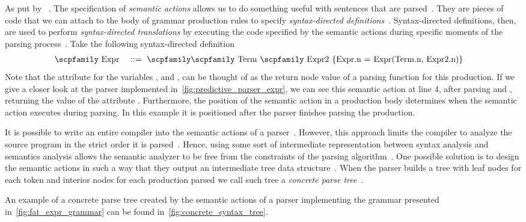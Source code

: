 \documentclass[
  oneside,
  english,
  coorientadorbanca,
  noabntexcite
]{ufsc-thesis-rn46-2019}
\def\bnfdef{::=}
\newcommand{\codett}[1]{\text{\scpfamily#1}}
\newcommand{\code}[1]{\text{\scpfamily\setlength\spaceskip{0.35em}#1}}
\newcommand{\bnfvar}[1]{\codett{#1}}
\newcommand{\bnfprod}[2]{\bnfvar{#1} & \ & \bnfdef{} & \ \code{#2}}
\begin{document}
As put by~\textcite{appel2003modern} .
The specification of \textit{semantic actions} allows us to do something useful with sentences that are parsed~\cite{appel2003modern}.
They are pieces of code that we can attach to the body of grammar production rules to specify \textit{syntax-directed definitions}~\cite{Aho:2006:CPT:1177220}.
Syntax-directed definitions, then, are used to perform \textit{syntax-directed translations} by executing the code specified by the semantic actions during specific moments of the parsing process~\cite{Aho:2006:CPT:1177220}.
Take the following syntax-directed definition
\begin{alignat}{2}
  \bnfprod{Expr}{\bnfvar{Term} \bnfvar{Expr2} \{Expr.n = Expr(Term.n, Expr2.n)\}} \label{eq:sdd_example}
\end{alignat}
Note that the attribute \codett{n} for the variables \bnfvar{Expr}, \bnfvar{Term} and \bnfvar{Expr2}, can be thought of as the return node value of a parsing function for this production.
If we give a closer look at the parser implemented in~\cref{fig:predictive_parser_expr}, we can see this semantic action at line 4, after parsing \bnfvar{Term} and \bnfvar{Expr2}, returning the value of the attribute \codett{Expr.n}.
Furthermore, the position of the semantic action in a production body determines when the semantic action executes during parsing.
In this example it is positioned after the parser finishes parsing the production.

It is possible to write an entire compiler into the semantic actions of a parser~\cite{appel2003modern}.
However, this approach limits the compiler to analyze the source program in the strict order it is parsed~\cite{appel2003modern}.
Hence, using some sort of intermediate representation between syntax analysis and semantics analysis allows the semantic analyzer to be free from the constraints of the parsing algorithm~\cite{appel2003modern}.
One possible solution is to design the semantic actions in such a way that they output an intermediate tree data structure~\cite{appel2003modern}.
When the parser builds a tree with leaf nodes for each token and interior nodes for each production parsed we call such tree a \textit{concrete parse tree}~\cite{appel2003modern}.

An example of a concrete parse tree created by the semantic actions of a parser implementing the grammar presented in~\cref{fig:fat_expr_grammar} can be found in~\cref{fig:concrete_syntax_tree}.
\end{document}

